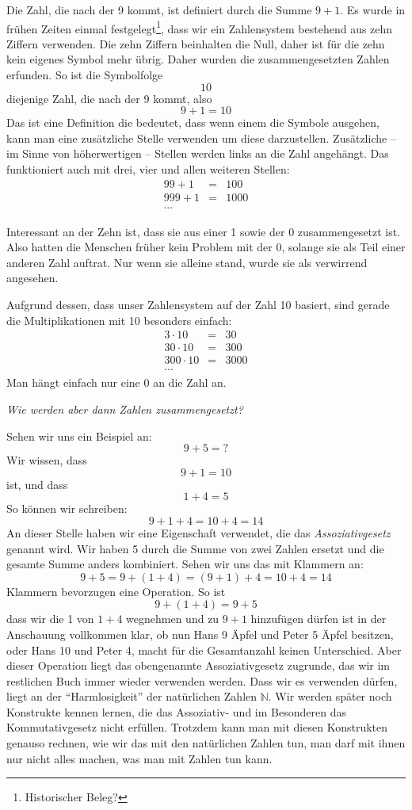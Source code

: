 Die Zahl, die nach der 9 kommt, ist definiert durch die Summe $9+1$. Es wurde in frühen Zeiten einmal festgelegt\footnote{Historischer Beleg?}, dass wir ein Zahlensystem bestehend aus zehn Ziffern verwenden. Die zehn Ziffern beinhalten die Null, daher ist für die zehn kein eigenes Symbol mehr übrig. Daher wurden die zusammengesetzten Zahlen erfunden. So ist die Symbolfolge
\[10\]
diejenige Zahl, die nach der 9 kommt, also
\[9+1=10\]
Das ist eine Definition die bedeutet, dass wenn einem die Symbole ausgehen, kann man eine zusätzliche Stelle verwenden um diese darzustellen. Zusätzliche -- im Sinne von höherwertigen -- Stellen werden links an die Zahl angehängt. Das funktioniert auch mit drei, vier und allen weiteren Stellen:
\begin{eqnarray*}
99+1 &=& 100 \\
999+1 &=& 1000 \\
\cdots
\end{eqnarray*}

Interessant an der Zehn ist, dass sie aus einer 1 sowie der 0 zusammengesetzt ist. Also hatten die Menschen früher kein Problem mit der 0, solange sie als Teil einer anderen Zahl auftrat. Nur wenn sie alleine stand, wurde sie als verwirrend angesehen.

Aufgrund dessen, dass unser Zahlensystem auf der Zahl 10 basiert, sind gerade die Multiplikationen mit 10 besonders einfach: 
\begin{eqnarray*}
3\cdot 10 &=& 30 \\
30\cdot 10 &=& 300 \\
300\cdot 10 &=& 3000\\
\cdots
\end{eqnarray*}
Man hängt einfach nur eine 0 an die Zahl an.

\bigskip

\noindent \textsl{Wie werden aber dann Zahlen zusammengesetzt?}

\noindent Sehen wir uns ein Beispiel an:
\[9+5 = ?\]
Wir wissen, dass 
\[9+1 = 10\]
ist, und dass
\[1+4 = 5\]
So können wir schreiben:
\[9+1+4 = 10 + 4 = 14\]
An dieser Stelle haben wir eine Eigenschaft verwendet, die das \emph{Assoziativgesetz} genannt wird. Wir haben 5 durch die Summe von zwei Zahlen ersetzt und die gesamte Summe anders kombiniert. Sehen wir uns das mit Klammern an:
\[9+5 = 9+(1+4) = (9+1)+4 = 10+4 = 14\]
Klammern bevorzugen eine Operation. So ist
\[9+(1+4)=9+5\]
dass wir die 1 von $1+4$ wegnehmen und zu $9+1$ hinzufügen dürfen ist in der Anschauung vollkommen klar, ob nun Hans 9 Äpfel und Peter 5 Äpfel besitzen, oder Hans 10 und Peter 4, macht für die Gesamtanzahl keinen Unterschied. Aber dieser Operation liegt das obengenannte Assoziativgesetz zugrunde, das wir im restlichen Buch immer wieder verwenden werden. Dass wir es verwenden dürfen, liegt an der "`Harmlosigkeit"' der natürlichen Zahlen $\mathbb{N}$. Wir werden später noch Konstrukte kennen lernen, die das Assoziativ- und im Besonderen das Kommutativgesetz nicht erfüllen. Trotzdem kann man mit diesen Konstrukten genauso rechnen, wie wir das mit den natürlichen Zahlen tun, man darf mit ihnen nur nicht alles machen, was man mit Zahlen tun kann.

